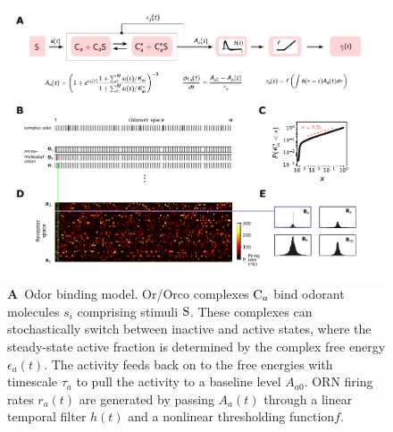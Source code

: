 \begin{figure}[!tb]
	\centering
	\begin{subfigure}[t]{\linewidth}
		\label{fig:tuning_curves_a}
	\end{subfigure}
	\begin{subfigure}[t]{0\linewidth}
		\label{fig:tuning_curves_b}
	\end{subfigure}
	\begin{subfigure}[t]{0\linewidth}
		\label{fig:tuning_curves_c}
	\end{subfigure}
	\begin{subfigure}[t]{0\linewidth}
		\label{fig:tuning_curves_d}
	\end{subfigure}
	\begin{subfigure}[t]{0\linewidth}
		\label{fig:tuning_curves_e}
	\end{subfigure}
	\begin{subfigure}[t]{0\linewidth}
		\label{fig:tuning_curves_f}
	\end{subfigure}
	\includegraphics[width=\textwidth]{figures/1_tuning_curves}
	\caption{\footnotesize{
		\textbf{A}~Odor binding model. Or/Orco complexes $\textup{C}_a$ bind odorant molecules $s_i$ comprising stimuli $\textup{S}$. These complexes can stochastically switch between inactive and active states, where the steady-state active fraction is determined by the complex free energy $\epsilon_a(t)$. The activity feeds back on to the free energies with timescale $\tau_a$ to pull the activity to a baseline level $A_{a0}$. ORN firing rates $r_a(t)$ are generated by passing $A_a(t)$ through a linear temporal filter $h(t)$ and a nonlinear thresholding function$f$. 
}}
\end{figure}
